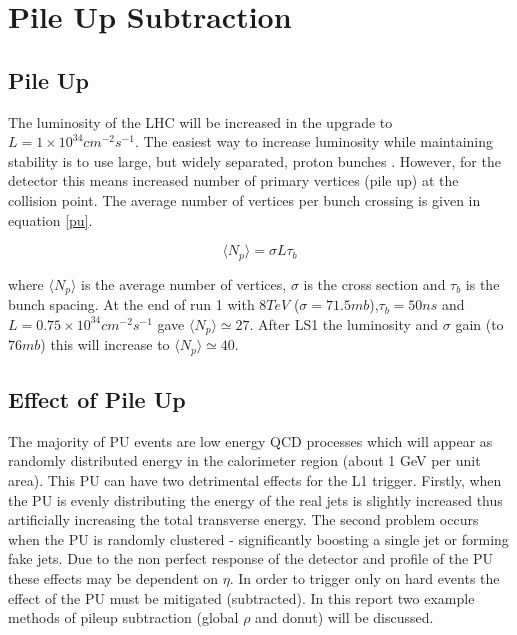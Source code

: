 \section{Pile Up Subtraction}
\subsection{Pile Up}
The luminosity of the LHC will be increased in the upgrade to $L = 1\times10^{34} cm^{-2}s^{-1}$. The easiest way to increase luminosity while maintaining stability is to use large, but widely separated, proton bunches \cite{PUform}. However, for the detector this means increased number of primary vertices (pile up) at the collision point. The average number of vertices per bunch crossing is given in equation \ref{pu}.

\begin{equation}
\langle N_p \rangle = \sigma L \tau_b
\label{pu}
\end{equation}

where $\langle N_p \rangle$ is the average number of vertices, $\sigma$ is the cross section and $\tau_b$ is the bunch spacing. At the end of run 1 with $8 TeV$ ($\sigma = 71.5mb$),$\tau_b = 50ns$ and $L = 0.75\times10^{34} cm^{-2}s^{-1}$ gave $\langle N_p \rangle\simeq27$. After LS1 the luminosity and $\sigma$ gain (to $76mb$) this will increase to $\langle N_p \rangle\simeq40$. 
\subsection{Effect of Pile Up}
The majority of PU events are low energy QCD processes which will appear as randomly distributed energy in the calorimeter region (about 1 GeV per unit area). This PU can have two detrimental effects for the L1 trigger. Firstly, when the PU is evenly distributing the energy of the real jets is slightly increased thus artificially increasing the total transverse energy. The second problem occurs when the PU is randomly clustered - significantly boosting a single jet or forming fake jets. Due to the non perfect response of the detector and profile of the PU these effects may be dependent on $\eta$. In order to trigger only on hard events the effect of the PU must be mitigated (subtracted). In this report two example methods of pileup subtraction (global $\rho$ and donut) will be discussed.
